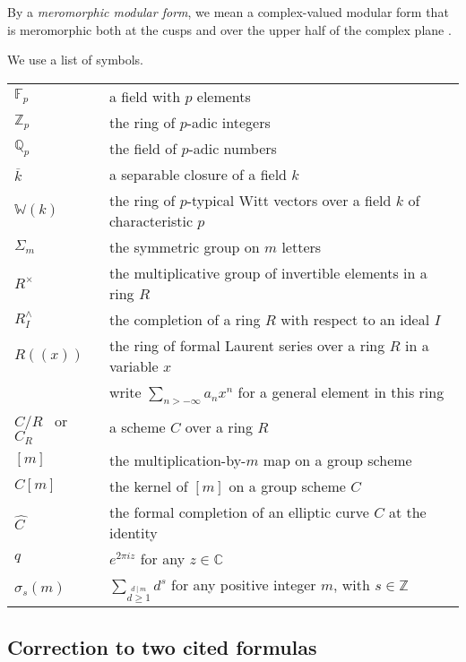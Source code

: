 \documentclass{gtpart}
\theoremstyle{definition}
\theoremstyle{remark}
\newcommand{\mb}[1]{\mathbb{#1}}
\newcommand{\BC}{{\mb C}}
\newcommand{\BF}{{\mb F}}
\newcommand{\BQ}{{\mb Q}}
\newcommand{\BW}{{\mb W}}
\newcommand{\BZ}{{\mb Z}}
\newcommand{\HC}{\widehat{C~}\!}
\newcommand{\si}{\sigma}
\renewcommand{\=}{\approx}
\renewcommand{\-}{\sim}
\numberwithin{equation}{section}
\begin{document}
By a {\em meromorphic modular form}, we mean a complex-valued modular form that 
is meromorphic both at the cusps and over the upper half of the complex plane 
\cite[Definition 1.8]{web}.  

We use a list of symbols.  
\begin{center}
 \begin{tabular}{ll}
  $\BF_p$ & a field with $p$ elements \\
  $\BZ_p$ & the ring of $p$-adic integers \\
  $\BQ_p$ & the field of $p$-adic numbers \\
  $\overline{k}$ & a separable closure of a field $k$ \\
  $\BW(k)$ & the ring of $p$-typical Witt vectors over a field $k$ of 
             characteristic $p$ \\
  $\Sigma_m$ & the symmetric group on $m$ letters \\
  $R^\times$ & the multiplicative group of invertible elements in a ring $R$ \\
  $R_I^\wedge$ & the completion of a ring $R$ with respect to an ideal $I$ \\
  $R(\!(x)\!)$ & the ring of formal Laurent series over a ring $R$ in a variable 
                 $x$ \\
               & write $\sum_{n > -\infty} a_n x^n$ for a general element in 
                 this ring \\
  $C/R$ \, or \, $C_R$ & a scheme $C$ over a ring $R$ \\
  $[m]$ & the multiplication-by-$m$ map on a group scheme \\
  $C[m]$ & the kernel of $[m]$ on a group scheme $C$ \\
  $\HC$ & the formal completion of an elliptic curve $C$ at the identity \\
  $q$ & $e^{2 \pi i z}$ for any $z \in \BC$ \\
  $\si_s(m)$ & $\displaystyle \sum_{\stackrel{\scriptstyle d~\!|~\!m}{d \geq 1}} 
               d^s$ for any positive integer $m$, with $s \in \BZ$ 
 \end{tabular}
\end{center}



\subsection{Correction to two cited formulas}
\label{subsec:correction}
\end{document}
